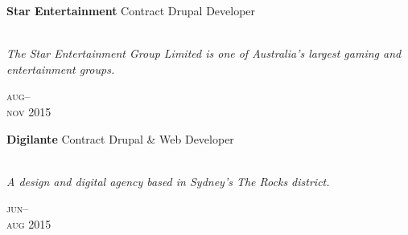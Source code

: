 \begin{minipage}[t]{0.70\textwidth}
\textbf{Star Entertainment}\phantom{..} Contract Drupal Developer \\
\\
{\small
\textit{The Star Entertainment Group Limited is one of Australia's largest gaming and entertainment groups.}
\par}
\end{minipage}
\begin{minipage}[t]{0.30\textwidth}
{
\hfill \textsc{aug}--\\ 
\hspace*{0pt} \hfill \textsc{nov} 2015
\par
}
\end{minipage}
\vspace{0.2in}

\begin{minipage}[t]{0.70\textwidth}
\textbf{Digilante}\phantom{..} Contract Drupal \& Web Developer \\
\\
{\small
\textit{A design and digital agency based in Sydney's The Rocks district.}
\par}
\end{minipage}
\begin{minipage}[t]{0.30\textwidth}
{
\hfill \textsc{jun}--\\ 
\hspace*{0pt} \hfill \textsc{aug} 2015
\par
}
\end{minipage}
\vspace{0.2in}


